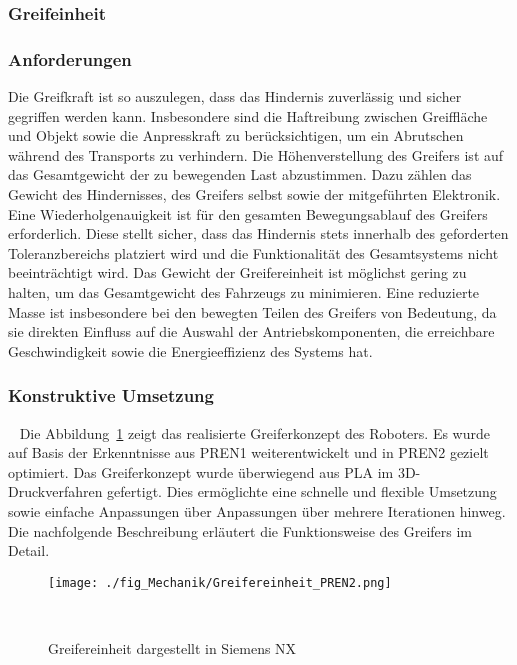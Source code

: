 \documentclass[main.tex]{subfiles} %
\begin{document}

\subsubsection{Greifeinheit}

\subsubsection*{Anforderungen}

Die Greifkraft ist so auszulegen, dass das Hindernis zuverlässig und sicher gegriffen werden kann.
Insbesondere sind die Haftreibung zwischen Greiffläche und Objekt sowie die Anpresskraft zu berücksichtigen,
um ein Abrutschen während des Transports zu verhindern. Die Höhenverstellung des Greifers ist auf das Gesamtgewicht
der zu bewegenden Last abzustimmen. Dazu zählen das Gewicht des Hindernisses, des Greifers selbst sowie der
mitgeführten Elektronik. Eine Wiederholgenauigkeit ist für den gesamten Bewegungsablauf des Greifers erforderlich.
Diese stellt sicher, dass das Hindernis stets innerhalb des geforderten Toleranzbereichs platziert wird und die
Funktionalität des Gesamtsystems nicht beeinträchtigt wird. Das Gewicht der Greifereinheit ist möglichst gering 
zu halten, um das Gesamtgewicht des Fahrzeugs zu minimieren. Eine reduzierte Masse ist insbesondere bei den bewegten
Teilen des Greifers von Bedeutung, da sie direkten Einfluss auf die Auswahl der Antriebskomponenten, die erreichbare
Geschwindigkeit sowie die Energieeffizienz des Systems hat.


\subsubsection*{Konstruktive Umsetzung}~\label{sec:Konstruktive_Umsetzung} 
Die Abbildung~\ref{fig:Greifereinheit} zeigt das realisierte Greiferkonzept des Roboters.
Es wurde auf Basis der Erkenntnisse aus PREN1 weiterentwickelt und in PREN2 gezielt optimiert.
Das Greiferkonzept wurde überwiegend aus PLA im 3D-Druckverfahren gefertigt.
Dies ermöglichte eine schnelle und flexible Umsetzung sowie einfache Anpassungen über Anpassungen
über mehrere Iterationen hinweg. Die nachfolgende Beschreibung erläutert die Funktionsweise des Greifers im Detail.

\begin{figure}[H]
    \centering
    \texttt{[image: ./fig\_Mechanik/Greifereinheit\_PREN2.png]}
    \caption{Greifereinheit dargestellt in Siemens NX}~\label{fig:Greifereinheit}
\end{figure}
\end{document}
